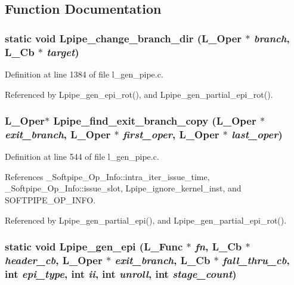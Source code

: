 \subsection{Function Documentation}
\subsubsection{\setlength{\rightskip}{0pt plus 5cm}static void Lpipe\_\-change\_\-branch\_\-dir (L\_\-Oper $\ast$ {\em branch}, L\_\-Cb $\ast$ {\em target})\hspace{0.3cm}{\tt  [static]}}\label{l__gen__pipe_8c_0bec54aba5a2d1f6b74452f61bc4964d}




Definition at line 1384 of file l\_\-gen\_\-pipe.c.

Referenced by Lpipe\_\-gen\_\-epi\_\-rot(), and Lpipe\_\-gen\_\-partial\_\-epi\_\-rot().
\subsubsection{\setlength{\rightskip}{0pt plus 5cm}L\_\-Oper$\ast$ Lpipe\_\-find\_\-exit\_\-branch\_\-copy (L\_\-Oper $\ast$ {\em exit\_\-branch}, L\_\-Oper $\ast$ {\em first\_\-oper}, L\_\-Oper $\ast$ {\em last\_\-oper})}\label{l__gen__pipe_8c_e170c12c10c855baea6d432483bb8f47}




Definition at line 544 of file l\_\-gen\_\-pipe.c.

References \_\-Softpipe\_\-Op\_\-Info::intra\_\-iter\_\-issue\_\-time, \_\-Softpipe\_\-Op\_\-Info::issue\_\-slot, Lpipe\_\-ignore\_\-kernel\_\-inst, and SOFTPIPE\_\-OP\_\-INFO.

Referenced by Lpipe\_\-gen\_\-partial\_\-epi(), and Lpipe\_\-gen\_\-partial\_\-epi\_\-rot().
\subsubsection{\setlength{\rightskip}{0pt plus 5cm}static void Lpipe\_\-gen\_\-epi (L\_\-Func $\ast$ {\em fn}, L\_\-Cb $\ast$ {\em header\_\-cb}, L\_\-Oper $\ast$ {\em exit\_\-branch}, L\_\-Cb $\ast$ {\em fall\_\-thru\_\-cb}, int {\em epi\_\-type}, int {\em ii}, int {\em unroll}, int {\em stage\_\-count})\hspace{0.3cm}{\tt  [static]}}\label{l__gen__pipe_8c_2674fb9325b92361e2fe22b6bad6ceb0}




